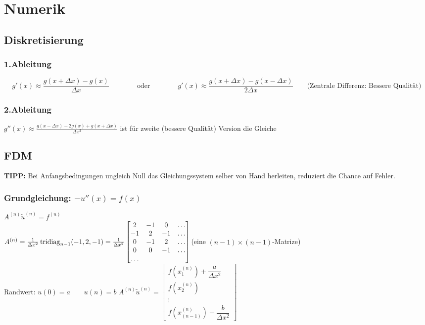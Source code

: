 
\section{Numerik}
\subsection{Diskretisierung}
\subsubsection{1.Ableitung}

$$g'(x)\approx \frac{g(x+\Delta x)-g(x)}{\Delta x} \qquad\qquad \text{oder}
\qquad\qquad \boxed{g'(x)\approx \frac{g(x+\Delta x)-g(x-\Delta x)}{2\Delta
x}}\qquad \text{(Zentrale Differenz: Bessere Qualität)}$$
\subsubsection{2.Ableitung}
$\boxed{g''(x)\approx \frac{g(x-\Delta x)-2 g(x) + g(x+ \Delta x)}{\Delta x^2}}$ ist für zweite (bessere Qualität) Version die Gleiche

\subsection{FDM}
\textbf{TIPP:} Bei Anfangsbedingungen ungleich Null das Gleichungssystem selber von Hand herleiten, reduziert die Chance auf Fehler.
\subsubsection{Grundgleichung: $-u''(x)=f(x)$}
$ A^{(n)} \tilde{u}^{(n)} =f^{(n)}   $\\
$A^{(n)}= \frac{1}{\Delta x^2} \operatorname{tridiag}_{n-1} (-1,2,-1) = \frac{1}{\Delta x^2}
  \begin{bmatrix}
             2& -1 & 0 & \ldots \\
             -1& 2 & -1 & \ldots \\
              0& -1 & 2 & \ldots \\
              0& 0 & -1 & \ldots \\
             \ldots 
           \end{bmatrix}$\qquad (eine $(n-1)\times(n-1)$-Matrize)\\ 
Randwert: $u(0)= a \qquad u(n)=b $ \qquad
$A^{(n)}\tilde{u}^{(n)} =\begin{bmatrix}
             f(x_1^{(n)}) + \dfrac{a}{\Delta x^2} \\
             f(x_2^{(n)}) \\
             \vdots  \\
             f(x_{(n-1)}^{(n)}) + \dfrac{b}{\Delta x^2}
           \end{bmatrix} $\\
